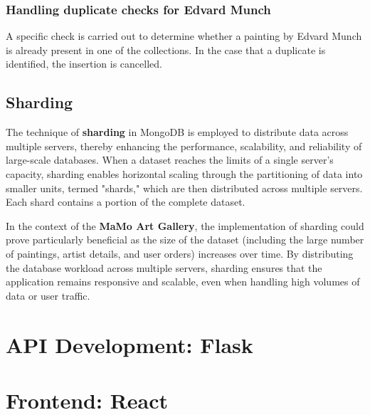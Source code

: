 \documentclass[a4paper,12pt]{article}
\begin{document}
\subsubsection{Handling duplicate checks for Edvard Munch}
A specific check is carried out to determine whether a painting by Edvard Munch is already present in one of the collections. In the case that a duplicate is identified, the insertion is cancelled.


\subsection{Sharding}
\justify

The technique of \textbf{sharding} in MongoDB is employed to distribute data across multiple servers, thereby enhancing the performance, scalability, and reliability of large-scale databases. When a dataset reaches the limits of a single server's capacity, sharding enables horizontal scaling through the partitioning of data into smaller units, termed "shards," which are then distributed across multiple servers. Each shard contains a portion of the complete dataset.

In the context of the \textbf{MaMo Art Gallery}, the implementation of sharding could prove particularly beneficial as the size of the dataset (including the large number of paintings, artist details, and user orders) increases over time. By distributing the database workload across multiple servers, sharding ensures that the application remains responsive and scalable, even when handling high volumes of data or user traffic.
\newpage
\section{API Development: Flask}
\justify

\newpage

\section{Frontend: React}
\justify
\end{document}
